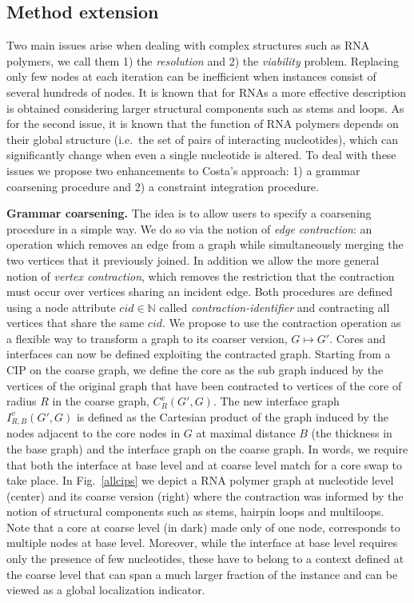 \documentclass[a4paper]{esannV2}
\newcommand*{\IN}[0]{\ensuremath{\mathbb{N}}}
\begin{document}
\subsection{Method extension}

Two main issues arise when dealing with complex structures such as RNA
polymers, we call them 1) the {\em resolution}\/ and 2) the {\em viability}
problem. Replacing only few nodes at
each iteration can be inefficient when instances consist of several hundreds
of nodes. It is known that for RNAs a more effective description is obtained
considering larger structural components such as stems  and loops. As for the
second issue, it is known that the function of RNA polymers depends on their
global structure (i.e.\ the set of pairs of interacting nucleotides), which can
significantly change when even a single nucleotide is altered. To deal with
these issues we propose two enhancements to Costa's approach: 1) a
grammar coarsening procedure and 2) a constraint integration procedure.


\textbf{Grammar coarsening.} The idea is to allow users to specify 
a coarsening procedure in a simple way. We do so via the notion of {\em edge
contraction}\/:
an operation which removes an edge from a graph while simultaneously merging
the two vertices that it previously joined. In addition we allow the more
general 
notion of {\em vertex contraction}, which removes the restriction that
the contraction must occur over vertices sharing an incident edge.
Both
procedures are defined using a node attribute $cid \in \IN$ called 
{\em contraction-identifier}\/ and contracting all vertices that share the same $cid$. 
We propose to use the contraction operation as a flexible way to
transform a graph to its coarser version, $G \mapsto G'$. Cores and interfaces
can now be defined exploiting the contracted graph. Starting from a CIP on the
coarse graph, we define the core as the sub graph induced by the vertices of
the original graph that have been contracted to vertices of the core of radius
$R$ in the coarse graph, $C_R^v(G',G)$.  The new interface graph
$I_{R,B}^v(G',G)$ is defined as the Cartesian product of the graph induced by
the nodes adjacent to the core nodes in $G$ at maximal distance $B$ (the
thickness in the base graph) and the interface graph on the coarse graph. In
words, we require that both the interface at base level and at coarse level
match for a core swap to take place.
In Fig.~\ref{allcips}  we depict a RNA
polymer graph at nucleotide level (center) and its coarse version (right)
where the contraction was informed by the notion of structural components such
as stems, hairpin loops and multiloops. Note that a core at coarse
level (in dark) made only of one node, corresponds to multiple nodes at
base level. Moreover, while the interface at base level requires only the
presence of few nucleotides, these have to belong to a context defined at the
coarse level that can span a much larger fraction of the instance and can be
viewed as a global localization indicator.
\end{document}
